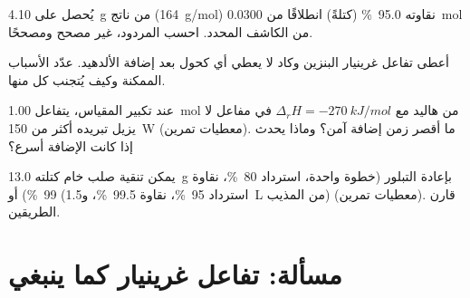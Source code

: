 \begin{exercise}[$\star\star$]\label{exo:b2:lab-techniques-2:9}
يُحصل على \qty{4.10}{g} من ناتج (\qty{164}{g/mol}) نقاوته 95.0~\% (كتلةً) انطلاقًا من \qty{0.0300}{mol}
من الكاشف المحدد. احسب المردود، غير مصحح ومصححًا.
\end{exercise}

\begin{exercise}[$\star\star\star$]\label{exo:b2:lab-techniques-2:10}
أعطى تفاعل غرينيار البنزين وكاد لا يعطي أي كحول بعد إضافة الألدهيد. عدّد
الأسباب الممكنة وكيف يُتجنب كل منها.
\end{exercise}

\begin{exercise}[$\star\star\star$]\label{exo:b2:lab-techniques-2:11}
عند تكبير المقياس، يتفاعل \qty{1.00}{mol} من هاليد مع $\Delta_rH = \qty{-270}{kJ/mol}$ في مفاعل
لا يزيل تبريده أكثر من \qty{150}{W} (معطيات تمرين). ما أقصر زمن إضافة آمن؟ وماذا
يحدث إذا كانت الإضافة أسرع؟
\end{exercise}

\begin{exercise}[$\star\star\star$]\label{exo:b2:lab-techniques-2:12}
يمكن تنقية صلب خام كتلته \qty{13.0}{g} بإعادة التبلور (خطوة واحدة، استرداد 80~\%، نقاوة
99~\%) أو  (استرداد 95~\%، نقاوة 99.5~\%، و\qty{1.5}{L} من المذيب) (معطيات
تمرين). قارن الطريقين.
\end{exercise}

\section{مسألة: تفاعل غرينيار كما ينبغي}

